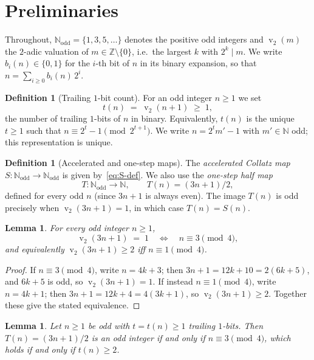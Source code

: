 \documentclass[11pt,a4paper]{article}
\newtheorem{lemma}[theorem]{Lemma}
\theoremstyle{definition}
\newtheorem{definition}[theorem]{Definition}
\theoremstyle{remark}
\DeclareMathOperator{\val}{v}
\newcommand{\N}{\mathbb{N}}
\newcommand{\Z}{\mathbb{Z}}
\newcommand{\Nodd}{\N_{\mathrm{odd}}}
\begin{document}
\section{Preliminaries}\label{sec:prelim}

Throughout, $\Nodd = \{1, 3, 5, \dots\}$ denotes the positive odd
integers and $\val_2(m)$ the $2$-adic valuation of $m \in \Z \setminus
\{0\}$, i.e.\ the largest $k$ with $2^k \mid m$.  We write
$b_i(n) \in \{0, 1\}$ for the $i$-th bit of $n$ in its binary expansion,
so that $n = \sum_{i \geq 0} b_i(n)\, 2^i$.

\begin{definition}[Trailing $1$-bit count]\label{def:t}
For an odd integer $n \geq 1$ we set
\[
  t(n) \;=\; \val_2(n + 1) \;\geq\; 1,
\]
the number of trailing $1$-bits of $n$ in binary.  Equivalently, $t(n)$
is the unique $t \geq 1$ such that $n \equiv 2^t - 1 \pmod{2^{t+1}}$.
We write $n = 2^t m' - 1$ with $m' \in \N$ odd; this representation is
unique.
\end{definition}

\begin{definition}[Accelerated and one-step maps]
The \emph{accelerated Collatz map} $S \colon \Nodd \to \Nodd$ is given
by~\eqref{eq:S-def}.  We also use the \emph{one-step half map}
\[
  T \colon \Nodd \to \N, \qquad T(n) = (3n+1)/2,
\]
defined for every odd $n$ (since $3n + 1$ is always even).  The image
$T(n)$ is odd precisely when $\val_2(3n+1) = 1$, in which case
$T(n) = S(n)$.
\end{definition}

\begin{lemma}\label{lem:val2-low-bits}
For every odd integer $n \geq 1$,
\[
  \val_2(3n + 1) \;=\; 1 \quad\Longleftrightarrow\quad n \equiv 3 \pmod{4},
\]
and equivalently $\val_2(3n+1) \geq 2$ iff $n \equiv 1 \pmod{4}$.
\end{lemma}

\begin{proof}
If $n \equiv 3 \pmod 4$, write $n = 4k + 3$; then
$3n + 1 = 12k + 10 = 2(6k + 5)$, and $6k + 5$ is odd, so
$\val_2(3n+1) = 1$.  If instead $n \equiv 1 \pmod 4$, write $n = 4k+1$;
then $3n+1 = 12k + 4 = 4(3k+1)$, so $\val_2(3n+1) \geq 2$.  Together
these give the stated equivalence.
\end{proof}

\begin{lemma}\label{lem:t-of-T}
Let $n \geq 1$ be odd with $t = t(n) \geq 1$ trailing $1$-bits.  Then
$T(n) = (3n+1)/2$ is an odd integer if and only if $n \equiv 3 \pmod 4$,
which holds if and only if $t(n) \geq 2$.
\end{lemma}
\end{document}

